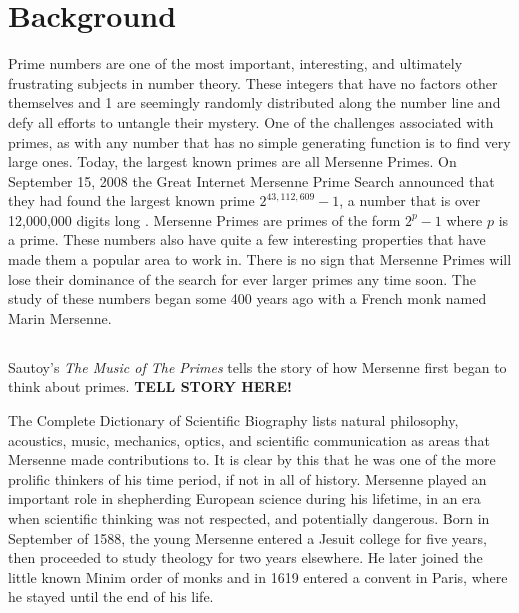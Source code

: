 \section{Background}

Prime numbers are one of the most important, interesting, and ultimately frustrating subjects in number theory. These integers that have no factors other themselves and 1 are seemingly randomly distributed along the number line and defy all efforts to untangle their mystery. One of the challenges associated with primes, as with any number that has no simple generating function is to find very large ones.  Today, the largest known primes are all Mersenne Primes.  On September 15, 2008 the Great Internet Mersenne Prime Search announced that they had found the largest known prime $2^{43,112,609}-1$, a number that is over 12,000,000 digits long \cite{gimps}.  Mersenne Primes are primes of the form $2^p - 1$ where $p$ is a prime.  These numbers also have quite a few interesting properties that have made them a popular area to work in. There is no sign that Mersenne Primes will lose their dominance of the search for ever larger primes any time soon.  The study of these numbers began some 400 years ago with a French monk named Marin Mersenne. 

\subsection{}

Sautoy's \textit{The Music of The Primes} \cite{sautoy} tells the story of how Mersenne first began to think about primes. \textbf{TELL STORY HERE!}  

The Complete Dictionary of Scientific Biography\cite{scibio} lists natural philosophy, acoustics, music, mechanics, optics, and scientific communication as areas that Mersenne made contributions to.  It is clear by this that he was one of the more prolific thinkers of his time period, if not in all of history. Mersenne played an important role in shepherding European science during his lifetime, in an era when scientific thinking was not respected, and potentially dangerous.  Born in September of 1588, the young Mersenne entered a Jesuit college for five years, then proceeded to study theology for two years elsewhere. He later joined the little known Minim order of monks and in 1619 entered a convent in Paris, where he stayed until the end of his life.  

